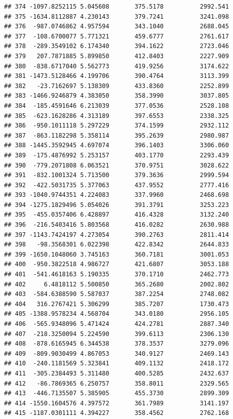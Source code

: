 \documentclass[
]{article}
\begin{document}
\begin{verbatim}
## 374 -1097.8252115 5.045608       375.5178          2992.541
## 375 -1634.8112887 4.230143       379.7241          3241.098
## 376  -987.0746862 4.957594       343.1040          2688.045
## 377  -108.6700077 5.771321       459.6777          2761.617
## 378  -289.3549102 6.174340       394.1622          2723.046
## 379   207.7871885 5.899850       412.8403          2227.909
## 380  -838.6717040 5.562773       419.9256          3174.622
## 381 -1473.5128466 4.199706       390.4764          3113.399
## 382   -23.7162697 5.138309       433.8360          2252.899
## 383 -1466.9246879 4.383050       358.3990          3037.805
## 384  -185.4591646 6.213039       377.0536          2528.108
## 385  -623.1628286 4.313189       397.6553          2338.325
## 386  -950.1011118 5.297229       374.1599          2932.112
## 387  -863.1182298 5.358114       395.2639          2980.987
## 388 -1445.3592945 4.697074       396.1403          3306.060
## 389  -175.4876992 5.253157       403.1770          2293.439
## 390  -779.2071808 6.063521       370.9751          3028.622
## 391  -832.1001324 5.713500       379.3636          2999.594
## 392  -422.5031735 5.377063       437.9552          2777.416
## 393 -1040.9744351 4.224083       337.9960          2468.698
## 394 -1275.1829496 5.054026       391.3791          3253.223
## 395  -455.0357406 6.428897       416.4328          3132.240
## 396  -216.5403416 5.803568       416.0282          2630.988
## 397 -1143.7424197 4.273054       390.2763          2811.414
## 398   -98.3568301 6.022398       422.8342          2644.833
## 399 -1650.1048060 3.745163       360.7181          3001.053
## 400  -950.3822518 4.986727       421.6807          3053.188
## 401  -541.4618163 5.190335       370.1710          2462.773
## 402     6.4818112 5.500850       365.2680          2002.802
## 403  -584.6388590 5.587037       387.2254          2748.082
## 404   316.2767421 5.306299       385.7207          1730.473
## 405 -1388.9578234 4.568704       343.0180          2956.105
## 406  -565.9348096 5.471424       424.2781          2887.340
## 407  -218.3250094 5.224590       399.6113          2306.130
## 408  -878.6165945 6.344538       378.3537          3279.096
## 409  -809.9030499 4.867053       340.9127          2469.143
## 410  -240.1181569 5.323841       409.1132          2418.172
## 411  -305.2384493 5.311480       400.5285          2432.637
## 412   -86.7869365 6.250757       358.8011          2329.565
## 413  -446.7135507 5.385905       455.3730          2899.309
## 414 -1550.1604576 4.397572       361.7989          3141.197
## 415 -1187.0301111 4.394227       358.4562          2762.168

\end{verbatim}
\end{document}
